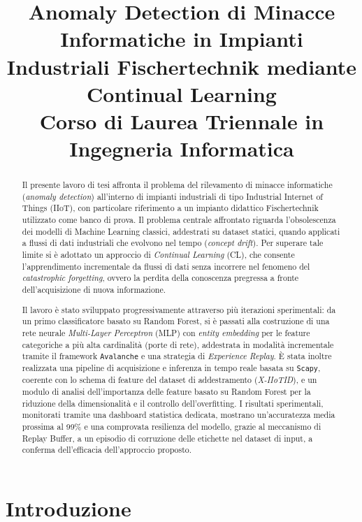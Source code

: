 \documentclass[12pt,a4paper]{report}
\title{
    \Large Anomaly Detection di Minacce Informatiche in Impianti Industriali Fischertechnik mediante Continual Learning \\
    \vspace{0.5cm}
    \normalsize Corso di Laurea Triennale in Ingegneria Informatica
}
\author{}
\date{}
\begin{document}
\maketitle

\begin{abstract}
\noindent
Il presente lavoro di tesi affronta il problema del rilevamento di minacce informatiche (\emph{anomaly detection}) all'interno di impianti industriali di tipo Industrial Internet of Things (IIoT), con particolare riferimento a un impianto didattico Fischertechnik utilizzato come banco di prova. Il problema centrale affrontato riguarda l'obsolescenza dei modelli di Machine Learning classici, addestrati su dataset statici, quando applicati a flussi di dati industriali che evolvono nel tempo (\emph{concept drift}). Per superare tale limite si è adottato un approccio di \emph{Continual Learning} (CL), che consente l'apprendimento incrementale da flussi di dati senza incorrere nel fenomeno del \emph{catastrophic forgetting}, ovvero la perdita della conoscenza pregressa a fronte dell'acquisizione di nuova informazione.

Il lavoro è stato sviluppato progressivamente attraverso più iterazioni sperimentali: da un primo classificatore basato su Random Forest, si è passati alla costruzione di una rete neurale \emph{Multi-Layer Perceptron} (MLP) con \emph{entity embedding} per le feature categoriche a più alta cardinalità (porte di rete), addestrata in modalità incrementale tramite il framework \texttt{Avalanche} e una strategia di \emph{Experience Replay}. È stata inoltre realizzata una pipeline di acquisizione e inferenza in tempo reale basata su \texttt{Scapy}, coerente con lo schema di feature del dataset di addestramento (\emph{X-IIoTID}), e un modulo di analisi dell'importanza delle feature basato su Random Forest per la riduzione della dimensionalità e il controllo dell'overfitting. I risultati sperimentali, monitorati tramite una dashboard statistica dedicata, mostrano un'accuratezza media prossima al 99\% e una comprovata resilienza del modello, grazie al meccanismo di Replay Buffer, a un episodio di corruzione delle etichette nel dataset di input, a conferma dell'efficacia dell'approccio proposto.
\end{abstract}

\tableofcontents

\chapter{Introduzione}
\end{document}
